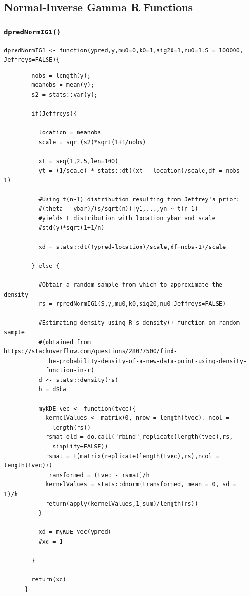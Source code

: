 \documentclass[12pt, a4paper]{article}
\begin{document}
  \subsection{Normal-Inverse Gamma R Functions}
    \subsubsection{\texttt{dpredNormIG1()}}\label{sec:dpredNormIG1}

    \texttt{\hyperref[sec:NormIG1imp]{dpredNormIG1} <- function(ypred,y,mu0=0,k0=1,sig20=1,nu0=1,S = 100000,
          Jeffreys=FALSE)\{ }

    \begin{verbatim}
        nobs = length(y);
        meanobs = mean(y);
        s2 = stats::var(y);

        if(Jeffreys){

          location = meanobs
          scale = sqrt(s2)*sqrt(1+1/nobs)

          xt = seq(1,2.5,len=100)
          yt = (1/scale) * stats::dt((xt - location)/scale,df = nobs-1)

          #Using t(n-1) distribution resulting from Jeffrey's prior:
          #(theta - ybar)/(s/sqrt(n))|y1,...,yn ~ t(n-1)
          #yields t distribution with location ybar and scale
          #std(y)*sqrt(1+1/n)

          xd = stats::dt((ypred-location)/scale,df=nobs-1)/scale

        } else {

          #Obtain a random sample from which to approximate the density
          rs = rpredNormIG1(S,y,mu0,k0,sig20,nu0,Jeffreys=FALSE)

          #Estimating density using R's density() function on random sample
          #(obtained from https://stackoverflow.com/questions/28077500/find-
            the-probability-density-of-a-new-data-point-using-density-
            function-in-r)
          d <- stats::density(rs)
          h = d$bw

          myKDE_vec <- function(tvec){
            kernelValues <- matrix(0, nrow = length(tvec), ncol =
              length(rs))
            rsmat_old = do.call("rbind",replicate(length(tvec),rs,
              simplify=FALSE))
            rsmat = t(matrix(replicate(length(tvec),rs),ncol = length(tvec)))
            transformed = (tvec - rsmat)/h
            kernelValues = stats::dnorm(transformed, mean = 0, sd = 1)/h
            return(apply(kernelValues,1,sum)/length(rs))
          }

          xd = myKDE_vec(ypred)
          #xd = 1

        }

        return(xd)
      }
    \end{verbatim}
\end{document}
